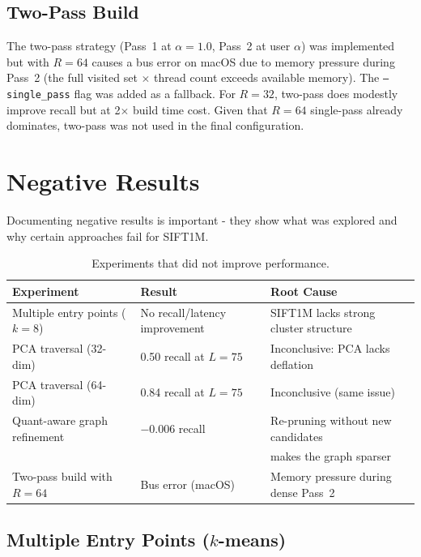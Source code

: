 \documentclass[10pt]{article}
\begin{document}
\subsection{Two-Pass Build}

The two-pass strategy (Pass~1 at $\alpha=1.0$, Pass~2 at user $\alpha$) was implemented but with $R=64$ causes a bus error on macOS due to memory pressure during Pass~2 (the full visited set $\times$ thread count exceeds available memory). The \texttt{--single\_pass} flag was added as a fallback. For $R=32$, two-pass does modestly improve recall but at 2$\times$ build time cost. Given that $R=64$ single-pass already dominates, two-pass was not used in the final configuration.

\section{Negative Results}

Documenting negative results is important - they show what was explored and why certain approaches fail for SIFT1M.

\begin{table}[H]
\centering
\small
\begin{tabular}{lll}
\toprule
\textbf{Experiment} & \textbf{Result} & \textbf{Root Cause} \\
\midrule
Multiple entry points ($k=8$) & No recall/latency improvement & SIFT1M lacks strong cluster structure \\
PCA traversal (32-dim) & 0.50 recall at $L=75$ & Inconclusive: PCA lacks deflation \\
PCA traversal (64-dim) & 0.84 recall at $L=75$ & Inconclusive (same issue) \\
Quant-aware graph refinement & $-$0.006 recall & Re-pruning without new candidates \\
 & & makes the graph sparser \\
Two-pass build with $R=64$ & Bus error (macOS) & Memory pressure during dense Pass~2 \\
\bottomrule
\end{tabular}
\caption{Experiments that did not improve performance.}
\label{tab:negative}
\end{table}

\subsection{Multiple Entry Points ($k$-means)}
\end{document}
